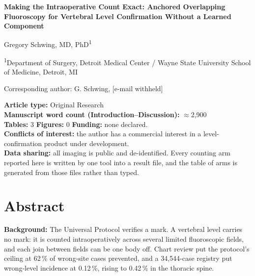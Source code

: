 \documentclass[11pt,letterpaper]{article}
\begin{document}
\begin{titlepage}
\begin{center}
{\Large\bfseries Making the Intraoperative Count Exact: Anchored Overlapping Fluoroscopy for Vertebral
Level Confirmation Without a Learned Component\par}
\vspace{1em}
{\normalsize Gregory Schwing, MD, PhD\textsuperscript{1}\par}
\vspace{0.5em}
{\small \textsuperscript{1}Department of Surgery, Detroit Medical Center / Wayne State University School of
Medicine, Detroit, MI\par}
\vspace{1em}
{\small Corresponding author: G. Schwing, [e-mail withheld]\par}
\end{center}
\vspace{1em}
\noindent\textbf{Article type:} Original Research\\
\textbf{Manuscript word count (Introduction--Discussion):} $\approx$2,900\\
\textbf{Tables:} 3 \quad \textbf{Figures:} 0 \quad \textbf{Funding:} none declared.\\
\textbf{Conflicts of interest:} the author has a commercial interest in a level-confirmation product under
development.\\
\textbf{Data sharing:} all imaging is public and de-identified. Every counting arm reported here is written
by one tool into a result file, and the table of arms is generated from those files rather than typed.
\end{titlepage}

\section*{Abstract}

\noindent\textbf{Background:} The Universal Protocol verifies a mark. A vertebral level carries no mark: it
is counted intraoperatively across several limited fluoroscopic fields, and each join between fields can be
one body off. Chart review put the protocol's ceiling at 62\,\% of wrong-site cases prevented, and a
34,544-case registry put wrong-level incidence at 0.12\,\%, rising to 0.42\,\% in the thoracic spine.
\end{document}
